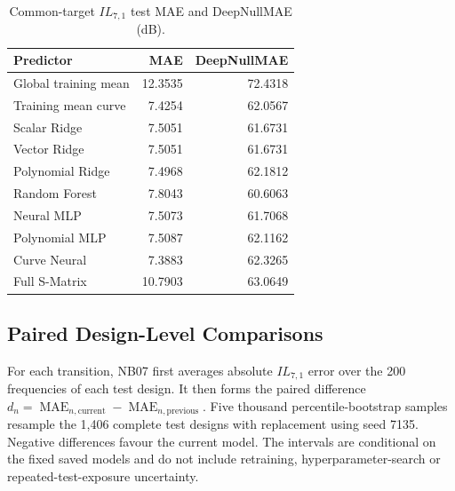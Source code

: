 \begin{table}[t]
    \caption{Common-target $IL_{7,1}$ test MAE and DeepNullMAE (dB).}
    \label{tab:appendix-deep-null-errors}
    \centering
    \begin{tabular}{@{}lrr@{}}
        \toprule
        Predictor & MAE & DeepNullMAE \\
        \midrule
        Global training mean & 12.3535 & 72.4318 \\
        Training mean curve  &  7.4254 & 62.0567 \\
        Scalar Ridge         &  7.5051 & 61.6731 \\
        Vector Ridge         &  7.5051 & 61.6731 \\
        Polynomial Ridge     &  7.4968 & 62.1812 \\
        Random Forest        &  7.8043 & 60.6063 \\
        Neural MLP           &  7.5073 & 61.7068 \\
        Polynomial MLP       &  7.5087 & 62.1162 \\
        Curve Neural         &  7.3883 & 62.3265 \\
        Full S-Matrix        & 10.7903 & 63.0649 \\
        \bottomrule
    \end{tabular}
\end{table}

\subsection{Paired Design-Level Comparisons}
For each transition, NB07 first averages absolute $IL_{7,1}$ error over the 200
frequencies of each test design. It then forms the paired difference
$d_n=\operatorname{MAE}_{n,\mathrm{current}}-
\operatorname{MAE}_{n,\mathrm{previous}}$. Five thousand percentile-bootstrap
samples resample the 1,406 complete test designs with replacement using seed
7135. Negative differences favour the current model. The intervals are
conditional on the fixed saved models and do not include retraining,
hyperparameter-search or repeated-test-exposure uncertainty.


